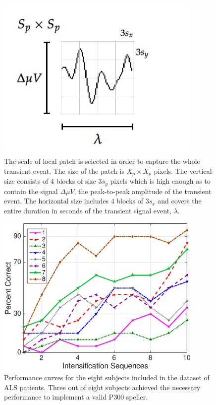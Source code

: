 \documentclass[utf8]{frontiersSCNS} %
\begin{document}
\begin{figure}[h!]
\centering
\includegraphics[width=10cm]{patchgeometry.pdf}
\caption{The scale of local patch is selected in order to capture the whole transient event.  The size of the patch is $X_p \times X_p$ pixels. The vertical size consists of $4$ blocks of size $3 s_y$ pixels which is high enough as to contain the signal $\Delta  \mu V $, the peak-to-peak amplitude of the transient event. The horizontal size includes $4$ blocks  of $3 s_x$ and covers the entire duration in seconds of the transient signal event, $ \lambda $.   }
\label{fig:patchgeometry}
\end{figure}

\begin{figure}[h!]
\centering
\includegraphics[width=10cm]{performance.eps}
\caption{Performance curves for the eight subjects included in the dataset of ALS patients.  Three out of eight subjects achieved the necessary performance to implement a valid P300 speller.}
\label{fig:performance}
\end{figure}
\end{document}
